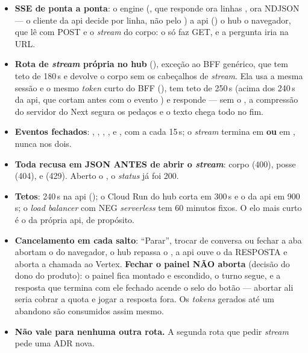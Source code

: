 \begin{itemize}
  \item \textbf{SSE de ponta a ponta}: o engine (, que
    responde ora linhas , ora NDJSON --- o cliente da api decide por
    linha, não pelo ) \seta{} a api () \seta{}
    o hub \seta{} o navegador, que lê com  POST e o \emph{stream} do
    corpo: o  só faz GET, e a pergunta iria na URL.
  \item \textbf{Rota de \emph{stream} própria no hub}
    (),
    exceção ao BFF genérico, que tem teto de 180\,s e devolve o corpo sem os
    cabeçalhos de \emph{stream}. Ela usa a mesma sessão e o mesmo \emph{token}
    curto do BFF (), tem teto de 250\,s (acima dos 240\,s da
    api, que cortam antes com o evento ) e responde
       --- sem o , a
    compressão do servidor do Next segura os pedaços e o texto chega todo no
    fim.
  \item \textbf{Eventos fechados}: , , ,
    ,  e , com  a cada 15\,s; o
    \emph{stream} termina em  \textbf{ou} em , nunca nos dois.
  \item \textbf{Toda recusa em JSON ANTES de abrir o \emph{stream}}: corpo (400),
    posse (404),  e  (429). Aberto o
    , o \emph{status} já foi 200.
  \item \textbf{Tetos}: 240\,s na api (); o Cloud Run do hub
    corta em 300\,s e o da api em 900\,s; o \emph{load balancer} com NEG
    \emph{serverless} tem 60 minutos fixos. O elo mais curto é o da própria api,
    de propósito.
  \item \textbf{Cancelamento em cada salto}: \enquote{Parar}, trocar de conversa
    ou fechar a aba abortam o  do navegador, o hub repassa o
    , a api ouve o  da RESPOSTA e aborta a chamada
    ao Vertex. \textbf{Fechar o painel NÃO aborta} (decisão do dono do produto):
    o painel fica montado e escondido, o turno segue, e a resposta que termina
    com ele fechado acende o selo do botão --- abortar ali seria cobrar a quota
    e jogar a resposta fora. Os \emph{tokens} gerados até um abandono são
    consumidos assim mesmo.
  \item \textbf{Não vale para nenhuma outra rota.} A segunda rota que pedir
    \emph{stream} pede uma ADR nova.
\end{itemize}

